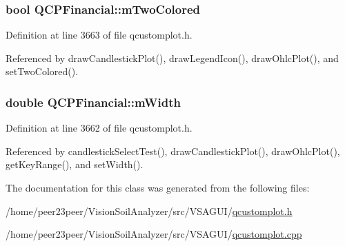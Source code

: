 \subsubsection[{m\+Two\+Colored}]{\setlength{\rightskip}{0pt plus 5cm}bool Q\+C\+P\+Financial\+::m\+Two\+Colored\hspace{0.3cm}{\ttfamily [protected]}}\label{class_q_c_p_financial_a6afe919190b884d9bac026cefcc8c0a8}


Definition at line 3663 of file qcustomplot.\+h.



Referenced by draw\+Candlestick\+Plot(), draw\+Legend\+Icon(), draw\+Ohlc\+Plot(), and set\+Two\+Colored().

\hypertarget{class_q_c_p_financial_af630e5eb8485146b9c777e63fd1cf993}{}
\subsubsection[{m\+Width}]{\setlength{\rightskip}{0pt plus 5cm}double Q\+C\+P\+Financial\+::m\+Width\hspace{0.3cm}{\ttfamily [protected]}}\label{class_q_c_p_financial_af630e5eb8485146b9c777e63fd1cf993}


Definition at line 3662 of file qcustomplot.\+h.



Referenced by candlestick\+Select\+Test(), draw\+Candlestick\+Plot(), draw\+Ohlc\+Plot(), get\+Key\+Range(), and set\+Width().



The documentation for this class was generated from the following files\+:\begin{DoxyCompactItemize}
\item 
/home/peer23peer/\+Vision\+Soil\+Analyzer/src/\+V\+S\+A\+G\+U\+I/\hyperlink{qcustomplot_8h}{qcustomplot.\+h}\item 
/home/peer23peer/\+Vision\+Soil\+Analyzer/src/\+V\+S\+A\+G\+U\+I/\hyperlink{qcustomplot_8cpp}{qcustomplot.\+cpp}\end{DoxyCompactItemize}
